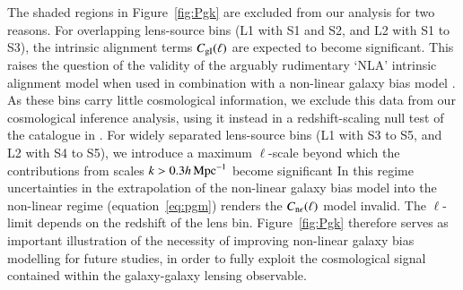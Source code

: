 The shaded regions in Figure~\ref{fig:Pgk} are excluded from our analysis for two reasons.   For overlapping lens-source bins (L1 with S1 and S2, and L2 with S1 to S3), the intrinsic alignment terms $C_{\rm gI}(\ell)$ are expected to become significant.   This raises the question of the validity of the arguably rudimentary `NLA' intrinsic alignment model when used in combination with a non-linear galaxy bias model \citep[see][for a self-consistent pertubative approach to both intrinsic alignment and galaxy bias modelling]{blazek/etal:2019}.   As these bins carry little cosmological information, we exclude this data from our cosmological inference analysis, using it instead in a redshift-scaling null test of the catalogue in \citet{giblin/etal:inprep}.   For widely separated lens-source bins (L1 with S3 to S5, and L2 with S4 to S5), we introduce a maximum $\ell$-scale beyond which the contributions from scales $k > 0.3 h \,{\rm Mpc}^{-1}$ become significant \citep[see figure 2 in][]{joachimi/etal:inprep}  In this regime uncertainties in the extrapolation of the \citet{sanchez/etal:2017} non-linear galaxy bias model into the non-linear regime (equation~\ref{eq:pgm}) renders the $C_{\rm n \epsilon}(\ell)$ model invalid.   The $\ell$-limit depends on the redshift of the lens bin.    Figure~\ref{fig:Pgk} therefore serves as important illustration of the necessity of improving non-linear galaxy bias modelling for future studies, in order to fully exploit the cosmological signal contained within the galaxy-galaxy lensing observable.


